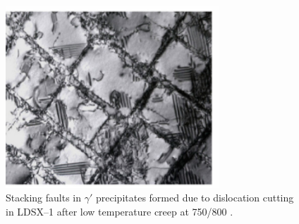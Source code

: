 \begin{figure}[H]
\begin{center}
\includegraphics[width=8cm]{LDSX1faults}
\caption{Stacking faults in $\gamma'$ precipitates formed due to dislocation cutting in LDSX--1 after low temperature creep at 750\celsius/800 \mega\pascal.}\label{fig:LDSX1faults}
\end{center}
\end{figure}
%

